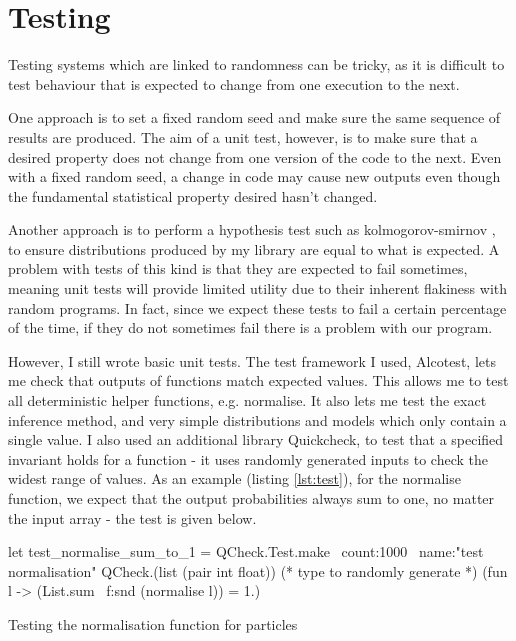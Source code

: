 	
\section{Testing}\label{sec:impl-testing}
	
Testing systems which are linked to randomness can be tricky, as it is difficult to test behaviour that is expected to change from one execution to the next. 

One approach is to set a fixed random seed and make sure the same sequence of results are produced. The aim of a unit test, however, is to make sure that a desired property does not change from one version of the code to the next. Even with a fixed random seed, a change in code may cause new outputs even though the fundamental statistical property desired hasn't changed. 

Another approach is to perform a hypothesis test such as kolmogorov-smirnov \cite{massey1951kolmogorov}, to ensure distributions produced by my library are equal to what is expected. A problem with tests of this kind is that they are expected to fail sometimes, meaning unit tests will provide limited utility due to their inherent flakiness with random programs. In fact, since we expect these tests to fail a certain percentage of the time, if they do not sometimes fail there is a problem with our program.

However, I still wrote basic unit tests. The test framework I used, Alcotest, lets me check that outputs of functions match expected values. This allows me to test all deterministic helper functions, e.g. normalise. It also lets me test the exact inference method, and very simple distributions and models which only contain a single value. I also used an additional library Quickcheck, to test that a specified invariant holds for a function - it uses randomly generated inputs to check the widest range of values. As an example (listing \ref{lst:test}), for the normalise function, we expect that the output probabilities always sum to one, no matter the input array - the test is given below.
	
	
\begin{listing}[!htb]
	\centering
	\begin{ocamlcode-in} 
let test_normalise_sum_to_1 =
QCheck.Test.make ~count:1000 ~name:"test normalisation"
QCheck.(list (pair int float)) (* type to randomly generate *)
(fun l -> (List.sum ~f:snd (normalise l)) = 1.)
	\end{ocamlcode-in}
	\caption{Testing the normalisation function for particles}
	\label{lst:test}
\end{listing}
	
